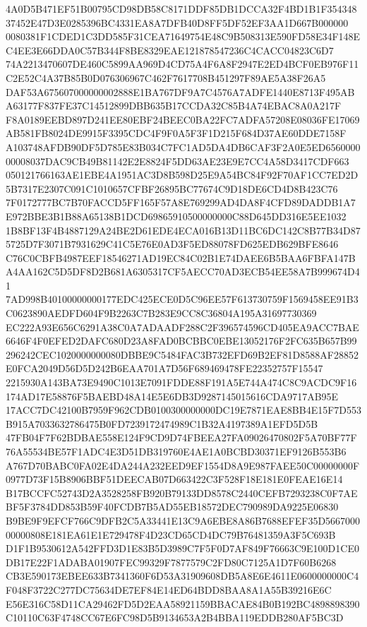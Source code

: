 \documentclass[UTF8,fontset=fandol,zihao=-4,a4paper]{ctexart}
\begin{document}
{{4A0D5B471EF51B00795CD98DB58C8171DDF85DB1DCCA32F4BD1B1F35434837452E47D3E0285396BC4331EA8A7DFB40D8FF5DF52EF3AA1D667B000000
0080381F1CDED1C3DD585F31CEA71649754E48C9B508313E590FD58E34F148EC4EE3E66DDA0C57B344F8BE8329EAE121878547236C4CACC04823C6D7
74A2213470607DE460C5899AA969D4CD75A4F6A8F2947E2ED4BCF0EB976F11C2E52C4A37B85B0D076306967C462F7617708B451297F89AE5A38F26A5
DAF53A675607000000002888E1BA767DF9A7C4576A7ADFE1440E8713F495ABA63177F837FE37C14512899DBB635B17CCDA32C85B4A74EBAC8A0A217F
F8A0189EEBD897D241EE80EBF24BEEC0BA22FC7ADFA57208E08036FE17069AB581FB8024DE9915F3395CDC4F9F0A5F3F1D215F684D37AE60DDE7158F
A103748AFDB90DF5D785E83B034C7FC1AD5DA4DB6CAF3F2A0E5ED656000000008037DAC9CB49B81142E2E8824F5DD63AE23E9E7CC4A58D3417CDF663
050121766163AE1EBE4A1951AC3D8B598D25E9A54BC84F92F70AF1CC7ED2D5B7317E2307C091C1010657CFBF26895BC77674C9D18DE6CD4D8B423C76
7F0172777BC7B70FACCD5FF165F57A8E769299AD4DA8F4CFD89DADDB1A7E972BBE3B1B88A65138B1DCD69865910500000000C88D645DD316E5EE1032
1B8BF13F4B4887129A24BE2D61EDE4ECA016B13D11BC6DC142C8B77B34D875725D7F3071B7931629C41C5E76E0AD3F5ED88078FD625EDB629BFE8646
C76C0CBFB4987EEF18546271AD19EC84C02B1E74DAEE6B5BAA6FBFA147BA4AA162C5D5DF8D2B681A6305317CF5AECC70AD3ECB54EE58A7B999674D41
7AD998B40100000000177EDC425ECE0D5C96EE57F613730759F1569458EE91B3C0623890AEDFD604F9B2263C7B283E9CC8C36804A195A31697730369
EC222A93E656C6291A38C0A7ADAADF288C2F396574596CD405EA9ACC7BAE6646F4F0EFED2DAFC680D23A8FAD0BCBBC0EBE13052176F2FC635B657B99
296242CEC1020000000080DBBE9C5484FAC3B732EFD69B2EF81D8588AF28852E0FCA2049D56D5D242B6EAA701A7D56F689469478FE22352757F15547
2215930A143BA73E9490C1013E7091FDDE88F191A5E744A474C8C9ACDC9F16174AD17E58876F5BAEBD48A14E5E6DB3D9287145015616CDA9717AB95E
17ACC7DC42100B7959F962CDB0100300000000DC19E7871EAE8BB4E15F7D553B915A7033632786475B0FD7239172474989C1B32A4197389A1EFD5D5B
47FB04F7F62BDBAE558E124F9CD9D74FBEEA27FA09026470802F5A70BF77F76A55534BE57F1ADC4E3D51DB319760E4AE1A0BCBD30371EF9126B553B6
A767D70BABC0FA02E4DA244A232EED9EF1554D8A9E987FAEE50C00000000F0977D73F15B8906BBF51DEECAB07D663422C3F528F18E181E0FEAE16E14
B17BCCFC52743D2A3528258FB920B79133DD8578C2440CEFB7293238C0F7AEBF5F3784DD853B59F40FCDB7B5AD55EB18572DEC790989DA9225E06830
B9BE9F9EFCF766C9DFB2C5A33441E13C9A6EBE8A86B7688EFEF35D566700000000808E181EA61E1E729478F4D23CD65CD4DC79B76481359A3F5C693B
D1F1B9530612A542FFD3D1E83B5D3989C7F5F0D7AF849F76663C9E100D1CE0DB17E22F1ADABA01907FEC99329F7877579C2FD80C7125A1D7F60B6268
CB3E590173EBEE633B7341360F6D53A31909608DB5A8E6E4611E0600000000C4F048F3722C277DC75634DE7EF84E14ED64BDD8BAA8A1A55B39216E6C
E56E316C58D11CA29462FD5D2EAA58921159BBACAE84B0B192BC4898898390C10110C63F4748CC67E6FC98D5B9134653A2B4BBA119EDDB280AF5BC3D
}}
\end{document}
